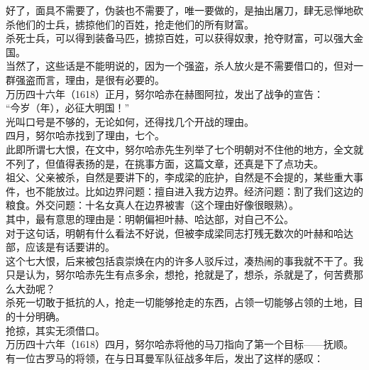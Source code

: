 \begin{multicols}{\theparacolNo}
好了，面具不需要了，伪装也不需要了，唯一要做的，是抽出屠刀，肆无忌惮地砍杀他们的士兵，掳掠他们的百姓，抢走他们的所有财富。\\

杀死士兵，可以得到装备马匹，掳掠百姓，可以获得奴隶，抢夺财富，可以强大金国。\\

当然了，这些话是不能明说的，因为一个强盗，杀人放火是不需要借口的，但对一群强盗而言，理由，是很有必要的。\\

万历四十六年（1618）正月，努尔哈赤在赫图阿拉，发出了战争的宣告：\\

“今岁（年），必征大明国！”\\

光叫口号是不够的，无论如何，还得找几个开战的理由。\\

四月，努尔哈赤找到了理由，七个。\\

此即所谓七大恨，在文中，努尔哈赤先生列举了七个明朝对不住他的地方，全文就不列了，但值得表扬的是，在挑事方面，这篇文章，还真是下了点功夫。\\

祖父、父亲被杀，自然是要讲下的，李成梁的庇护，自然是不会提的，某些重大事件，也不能放过。比如边界问题：擅自进入我方边界。经济问题：割了我们这边的粮食。外交问题：十名女真人在边界被害（这个理由好像很眼熟）。\\

其中，最有意思的理由是：明朝偏袒叶赫、哈达部，对自己不公。\\

对于这句话，明朝有什么看法不好说，但被李成梁同志打残无数次的叶赫和哈达部，应该是有话要讲的。\\

这个七大恨，后来被包括袁崇焕在内的许多人驳斥过，凑热闹的事我就不干了。我只是认为，努尔哈赤先生有点多余，想抢，抢就是了，想杀，杀就是了，何苦费那么大劲呢？\\

杀死一切敢于抵抗的人，抢走一切能够抢走的东西，占领一切能够占领的土地，目的十分明确。\\

抢掠，其实无须借口。\\

万历四十六年（1618）四月，努尔哈赤将他的马刀指向了第一个目标——抚顺。\\

有一位古罗马的将领，在与日耳曼军队征战多年后，发出了这样的感叹：\\


\end{multicols}
